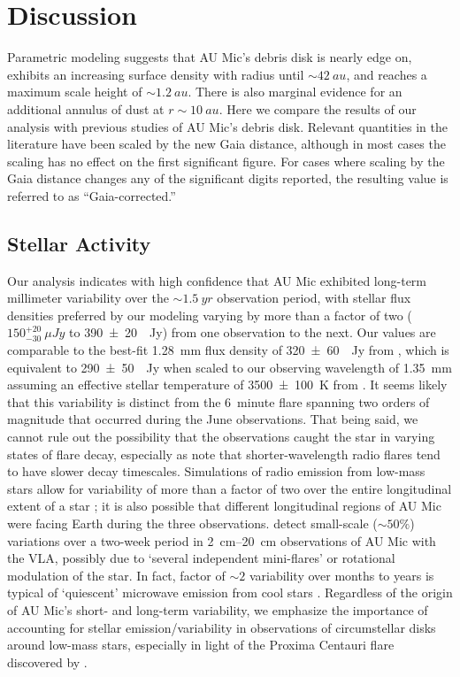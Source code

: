\documentclass[modern]{aastex62}
\begin{document}
\section{Discussion}
\label{section: discussion}

Parametric modeling suggests that AU Mic's debris disk is nearly edge on, exhibits an increasing surface density with radius until $\sim\SI{42}{au}$, and reaches a maximum scale height of $\sim\SI{1.2}{au}$.
There is also marginal evidence for an additional annulus of dust at $r \sim \SI{10}{au}$.
Here we compare the results of our analysis with previous studies of AU Mic's debris disk.
Relevant quantities in the literature have been scaled by the new Gaia distance, although in most cases the scaling has no effect on the first significant figure.  
For cases where scaling by the Gaia distance changes any of the significant digits reported, the resulting value is referred to as ``Gaia-corrected.''

\subsection{Stellar Activity}
\label{subsection: stellar activity}

Our analysis indicates with high confidence that AU Mic exhibited long-term millimeter variability over the $\sim \SI{1.5}{yr}$ observation period, with stellar
flux densities preferred by our modeling varying by more than a factor of two ($150^{+20}_{-30}~\si{\mu Jy}$ to \SI{390 \pm 20}{\mu Jy}) from one observation to the next.
Our values are comparable to the best-fit \SI{1.28}{mm} flux density of \SI{320 \pm 60}{\mu Jy} from \citet{macgregor13}, which is equivalent to \SI{290 \pm 50}{\mu Jy} when scaled to our observing wavelength of \SI{1.35}{mm} assuming an effective stellar temperature of \SI{3500 \pm 100}{K} from \citet{plavchan09}.
It seems likely that this variability is distinct from the \SI{6}{minute} flare spanning two orders of magnitude that occurred during the June observations. 
That being said, we cannot rule out the possibility that the observations caught the star in varying states of flare decay, especially as \citet{white96} note that shorter-wavelength radio flares tend to have slower decay timescales.
Simulations of radio emission from low-mass stars allow for variability of more than a factor of two over the entire longitudinal extent of a star \citep{llama18}; it is also possible that different longitudinal regions of AU Mic were facing Earth during the three observations.
\citet{cox85} detect small-scale ($\sim 50\%$) variations over  a two-week period in \SIrange{2}{20}{cm} observations of AU Mic with the VLA, possibly due to `several independent mini-flares' or rotational modulation of the star.
In fact, factor of $\sim 2$ variability over months to years is typical of `quiescent' microwave emission from cool stars \citep{guedel94}.
Regardless of the origin of AU Mic's short- and long-term variability, we emphasize the importance of accounting for stellar emission/variability in observations of circumstellar disks around low-mass stars, especially in light of the Proxima Centauri flare discovered by \citet{macgregor18}.
\end{document}
